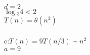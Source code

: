 \documentclass{article}
\begin{document}
                                                                                                                                                                                                                                                                                                                                                                                                                                                                                                                                                        $d=2$\\
                                                                                                                                                                                                                                                                                                                                                                                                                                                                                                                                                                $\log{_3}{4} < 2$\\
                                                                                                                                                                                                                                                                                                                                                                                                                                                                                                                                                                        $T(n) = \theta(n^2)$\\\\
                                                                                                                                                                                                                                                                                                                                                                                                                                                                                                                                                                                c:$T(n) = 9T(n/3) + n^2$\\
                                                                                                                                                                                                                                                                                                                                                                                                                                                                                                                                                                                        $a=9$\\
\end{document}
